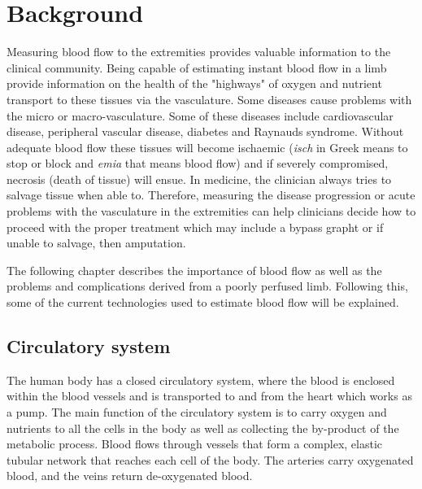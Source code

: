 
\chapter{Background}
\label{chapter background}

\ifpdf
    \graphicspath{{Chapter2/Figs/Raster/}{Chapter2/Figs/PDF/}{Chapter2/Figs/}}
\else
    \graphicspath{{Chapter2/Figs/Vector/}{Chapter2/Figs/}}
\fi

Measuring blood flow to the extremities provides valuable information to the clinical community. Being capable of estimating instant blood flow in a limb provide information on the health of the "highways" of oxygen and nutrient transport to these tissues via the vasculature. Some diseases cause problems with the micro or macro-vasculature. Some of these diseases include cardiovascular disease, peripheral vascular disease, diabetes and Raynauds syndrome. Without adequate blood flow these tissues will become ischaemic (\textit{isch} in Greek means to stop or block and \textit{emia} that means blood flow) and if severely compromised, necrosis (death of tissue) will ensue. In medicine, the clinician always tries to salvage tissue when able to. Therefore, measuring the disease progression or acute problems with the vasculature in the extremities can help clinicians decide how to proceed with the proper treatment which may include a bypass grapht or if unable to salvage, then amputation.


The following chapter describes the importance of blood flow as well as the problems and complications derived from a poorly perfused limb. Following this, some of the current technologies used to estimate blood flow will be explained.  

\section{Circulatory system} %
\label{section literature circulatory system}
The human body has a closed circulatory system, where the blood is enclosed within the blood vessels and is transported to and from the heart which works as a pump. The main function of the circulatory system is to carry oxygen and nutrients to all the cells in the body as well as collecting the by-product of the metabolic process. Blood flows through vessels that form a complex, elastic tubular network that reaches each cell of the body. The arteries carry oxygenated blood, and the veins return de-oxygenated blood. 

